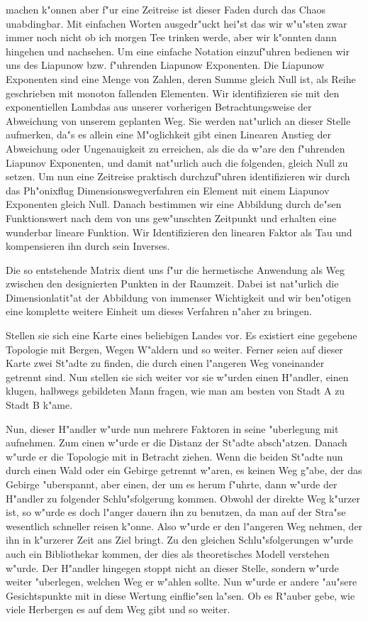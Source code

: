 \documentclass[a5paper,8pt]{book}
\begin{document}
machen k"onnen aber f"ur eine Zeitreise ist dieser Faden durch das Chaos unabdingbar. Mit einfachen Worten ausgedr"uckt hei"st das wir w"u"sten zwar immer noch nicht ob ich morgen Tee trinken werde, aber wir k"onnten dann hingehen und nachsehen.
Um eine einfache Notation einzuf"uhren bedienen wir uns des Liapunow bzw. f"uhrenden Liapunow Exponenten. Die Liapunow Exponenten sind eine Menge von Zahlen, deren Summe gleich Null ist, als Reihe geschrieben mit monoton fallenden Elementen. Wir identifizieren sie mit den exponentiellen Lambdas aus unserer vorherigen Betrachtungsweise der Abweichung von unserem geplanten Weg.
Sie werden nat"urlich an dieser Stelle aufmerken, da"s es allein eine M"oglichkeit gibt einen Linearen Anstieg der Abweichung oder Ungenauigkeit zu erreichen, als die da w"are den f"uhrenden Liapunov Exponenten, und damit nat"urlich auch die folgenden, gleich Null zu setzen.
Um nun eine Zeitreise praktisch durchzuf"uhren identifizieren wir durch das Ph"onixflug Dimensionswegverfahren ein Element mit einem Liapunov Exponenten gleich Null. Danach bestimmen wir eine Abbildung durch de"sen Funktionswert nach dem von uns gew"unschten Zeitpunkt und erhalten eine wunderbar lineare Funktion. Wir Identifizieren den linearen Faktor als Tau und kompensieren ihn durch sein Inverses.

Die so entstehende Matrix dient uns f"ur die hermetische Anwendung als Weg zwischen den designierten Punkten in der Raumzeit. Dabei ist nat"urlich die Dimensionlatit"at der Abbildung von immenser Wichtigkeit und wir ben"otigen eine komplette weitere Einheit um dieses Verfahren n"aher zu bringen.

Stellen sie sich eine Karte eines beliebigen Landes vor. Es existiert eine gegebene Topologie mit Bergen, Wegen W"aldern und so weiter. Ferner seien auf dieser Karte zwei St"adte zu finden, die durch einen l"angeren Weg voneinander getrennt sind. Nun stellen sie sich weiter vor sie w"urden einen H"andler, einen klugen, halbwegs gebildeten Mann fragen, wie man am besten von Stadt A zu Stadt B k"ame.

Nun, dieser H"andler w"urde nun mehrere Faktoren in seine "uberlegung mit aufnehmen. Zum einen w"urde er die Distanz der St"adte absch"atzen. Danach w"urde er die Topologie mit in Betracht ziehen. Wenn die beiden St"adte nun durch einen Wald oder ein Gebirge getrennt w"aren, es keinen Weg g"abe, der das Gebirge "uberspannt, aber einen, der um es herum f"uhrte, dann w"urde der H"andler zu folgender Schlu"sfolgerung kommen. Obwohl der direkte Weg k"urzer ist, so w"urde es doch l"anger dauern ihn zu benutzen, da man auf der Stra"se wesentlich schneller reisen k"onne. Also w"urde er den l"angeren Weg nehmen, der ihn in k"urzerer Zeit ans Ziel bringt.
Zu den gleichen Schlu"sfolgerungen w"urde auch ein Bibliothekar kommen, der dies als theoretisches Modell verstehen w"urde. Der H"andler hingegen stoppt nicht an dieser Stelle, sondern w"urde weiter "uberlegen, welchen Weg er w"ahlen sollte. Nun w"urde er andere "au"sere Gesichtspunkte mit in diese Wertung einflie"sen la"sen. Ob es R"auber gebe, wie viele Herbergen es auf dem Weg gibt und so weiter.
\end{document}
